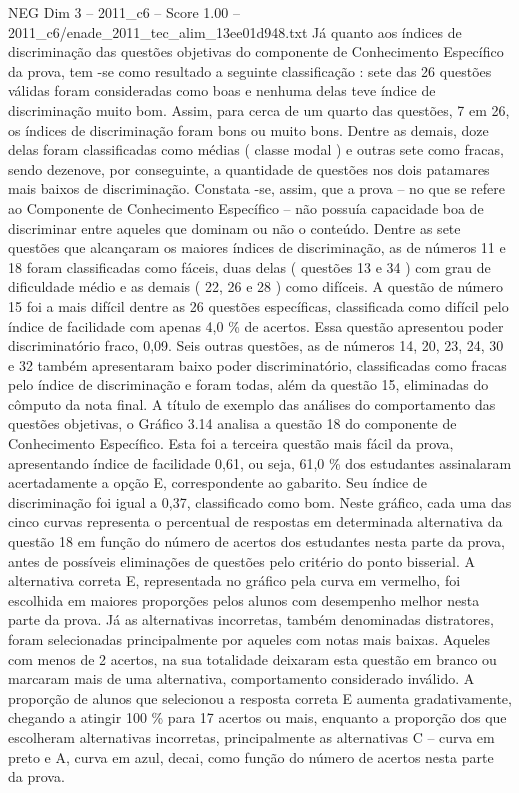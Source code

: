 \begin{textsample}{NEG Dim 3 – 2011\_c6 – Score 1.00 – 2011\_c6/enade\_2011\_tec\_alim\_13ee01d948.txt}
Já quanto aos índices de discriminação das questões objetivas do componente de Conhecimento Específico da prova, tem -se como resultado a seguinte classificação : sete das 26 questões válidas foram consideradas como boas e nenhuma delas teve índice de discriminação muito bom.
Assim, para cerca de um quarto das questões, 7 em 26, os índices de discriminação foram bons ou muito bons.
Dentre as demais, doze delas foram classificadas como médias ( classe modal ) e outras sete como fracas, sendo dezenove, por conseguinte, a quantidade de questões nos dois patamares mais baixos de discriminação.
Constata -se, assim, que a prova – no que se refere ao Componente de Conhecimento Específico – não possuía capacidade boa de discriminar entre aqueles que dominam ou não o conteúdo.
Dentre as sete questões que alcançaram os maiores índices de discriminação, as de números 11 e 18 foram classificadas como fáceis, duas delas ( questões 13 e 34 ) com grau de dificuldade médio e as demais ( 22, 26 e 28 ) como difíceis.
A questão de número 15 foi a mais difícil dentre as 26 questões específicas, classificada como difícil pelo índice de facilidade com apenas 4,0 \% de acertos.
Essa questão apresentou poder discriminatório fraco, 0,09.
Seis outras questões, as de números 14, 20, 23, 24, 30 e 32 também apresentaram baixo poder discriminatório, classificadas como fracas pelo índice de discriminação e foram todas, além da questão 15, eliminadas do cômputo da nota final.
A título de exemplo das análises do comportamento das questões objetivas, o Gráfico 3.14 analisa a questão 18 do componente de Conhecimento Específico.
Esta foi a terceira questão mais fácil da prova, apresentando índice de facilidade 0,61, ou seja, 61,0 \% dos estudantes assinalaram acertadamente a opção E, correspondente ao gabarito.
Seu índice de discriminação foi igual a 0,37, classificado como bom.
Neste gráfico, cada uma das cinco curvas representa o percentual de respostas em determinada alternativa da questão 18 em função do número de acertos dos estudantes nesta parte da prova, antes de possíveis eliminações de questões pelo critério do ponto bisserial.
A alternativa correta E, representada no gráfico pela curva em vermelho, foi escolhida em maiores proporções pelos alunos com desempenho melhor nesta parte da prova.
Já as alternativas incorretas, também denominadas distratores, foram selecionadas principalmente por aqueles com notas mais baixas.
Aqueles com menos de 2 acertos, na sua totalidade deixaram esta questão em branco ou marcaram mais de uma alternativa, comportamento considerado inválido.
A proporção de alunos que selecionou a resposta correta E aumenta gradativamente, chegando a atingir 100 \% para 17 acertos ou mais, enquanto a proporção dos que escolheram alternativas incorretas, principalmente as alternativas C – curva em preto e A, curva em azul, decai, como função do número de acertos nesta parte da prova.

\end{textsample}
